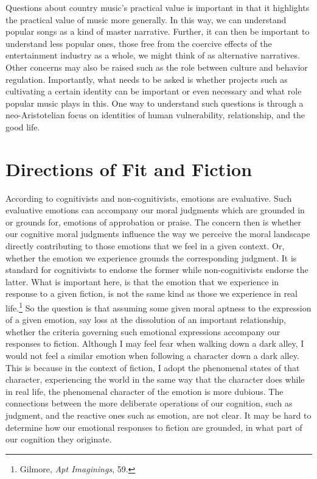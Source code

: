 \documentclass[phdthesis,12pt,final,a4paper]{wuthesis}
\theoremstyle{definition}
\theoremstyle{definition}
\theoremstyle{definition}
\theoremstyle{definition}
\theoremstyle{remark}
\begin{document}
Questions about country music's practical value is important in that it highlights the practical value of music more generally. In this way, we can understand popular songs as a kind of master narrative. Further, it can then be important to understand less popular ones, those free from the coercive effects of the entertainment industry as a whole, we might think of as alternative narratives. Other concerns may also be raised such as the role between culture and behavior regulation. Importantly, what needs to be asked is whether projects such as cultivating a certain identity can be important or even necessary and what role popular music plays in this. One way to understand such questions is through a neo-Aristotelian focus on identities of human vulnerability, relationship, and the good life.

\chapter{Directions of Fit and Fiction}\label{directions-of-fit-and-fiction}

According to cognitivists and non-cognitivists, emotions are evaluative. Such evaluative emotions can accompany our moral judgments which are grounded in or grounds for, emotions of approbation or praise. The concern then is whether our cognitive moral judgments influence the way we perceive the moral landscape directly contributing to those emotions that we feel in a given context. Or, whether the emotion we experience grounds the corresponding judgment. It is standard for cognitivists to endorse the former while non-cognitivists endorse the latter. What is important here, is that the emotion that we experience in response to a given fiction, is not the same kind as those we experience in real life.\footnote{Gilmore, \emph{Apt {Imaginings}}, 59.} So the question is that assuming some given moral aptness to the expression of a given emotion, say loss at the dissolution of an important relationship, whether the criteria governing such emotional expressions accompany our responses to fiction. Although I may feel fear when walking down a dark alley, I would not feel a similar emotion when following a character down a dark alley. This is because in the context of fiction, I adopt the phenomenal states of that character, experiencing the world in the same way that the character does while in real life, the phenomenal character of the emotion is more dubious. The connections between the more deliberate operations of our cognition, such as judgment, and the reactive ones such as emotion, are not clear. It may be hard to determine how our emotional responses to fiction are grounded, in what part of our cognition they originate.
\end{document}
